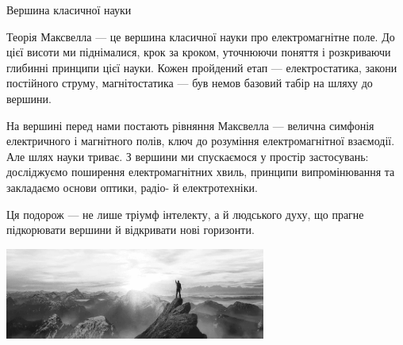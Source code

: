 \documentclass[onlytextwidth]{beamer}
\begin{document}
\begin{frame}{Вершина класичної науки}{}\small
	\begin{block}{}\justifying
        \alert{Теорія Максвелла --- це вершина класичної науки про електромагнітне поле.} До цієї висоти ми піднімалися, крок за кроком, уточнюючи
        поняття і розкриваючи глибинні принципи цієї науки. Кожен пройдений етап — електростатика, закони постійного струму, магнітостатика — був немов
        базовий табір на шляху до вершини.

        \medskip

        На вершині перед нами постають рівняння Максвелла --- велична симфонія електричного і магнітного полів, ключ до розуміння електромагнітної
        взаємодії. Але шлях науки триває. З вершини ми спускаємося у простір застосувань: досліджуємо поширення електромагнітних хвиль, принципи
        випромінювання та закладаємо основи оптики, радіо- й електротехніки.

        \medskip

        Ця подорож --- не лише тріумф інтелекту, а й людського духу, що прагне підкорювати вершини й відкривати нові горизонти.
	\end{block}
	\begin{center}
        \includegraphics[height=3cm]{ontop}
	\end{center}
\end{frame}
\end{document}
